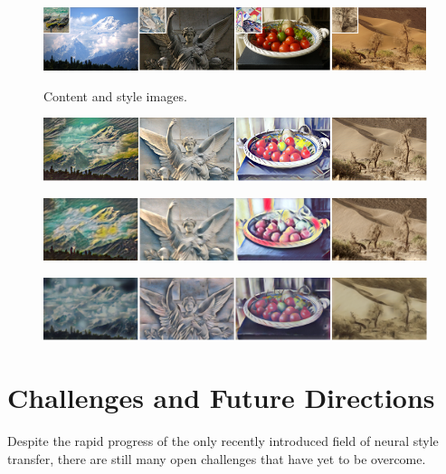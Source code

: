 \documentclass{seminar}
\begin{document}
	
	\begin{figure}[h]
		\centering
		\includegraphics[width=\textwidth]{nst_source.png}
		\caption{Content and style images.}\label{fig:source}
		\includegraphics[width=\textwidth]{nst_johnson.png}
		\caption{\cite{johnson2016perceptual}}\label{fig:johnson}
		\includegraphics[width=\textwidth]{nst_stylebank.png}
		\caption{\cite{chen2017stylebank}}\label{fig:stylebank}
		\includegraphics[width=\textwidth]{nst_chen.png}
		\caption{\cite{chen2016fast}}\label{fig:chen}
		\bigbreak
	\end{figure}
	
	\section{Challenges and Future Directions}
	Despite the rapid progress of the only recently introduced field of neural style transfer, there are still many open challenges that have yet to be overcome.
	
\end{document}
